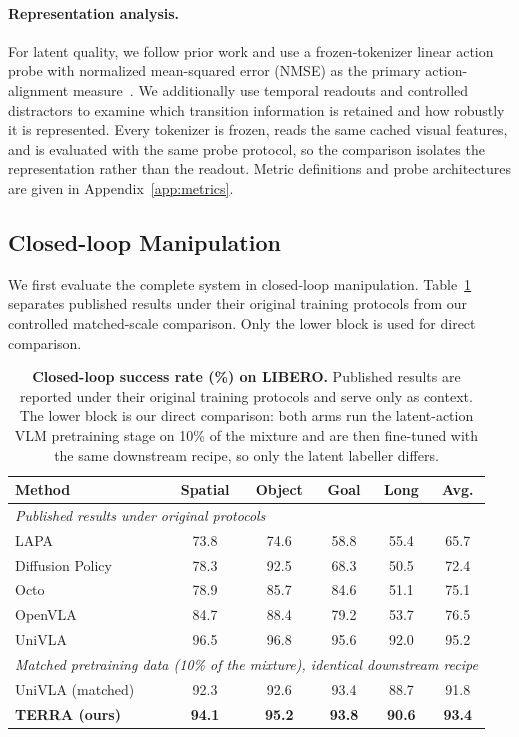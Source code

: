 \paragraph{Representation analysis.}
For latent quality, we follow prior work and use a frozen-tokenizer linear
action probe with normalized mean-squared error (NMSE) as the primary
action-alignment measure~\citep{lee2026why}.
We additionally use temporal readouts and controlled distractors to examine
which transition information is retained and how robustly it is represented.
Every tokenizer is frozen, reads the same cached visual features, and is
evaluated with the same probe protocol, so the comparison isolates the
representation rather than the readout.
Metric definitions and probe architectures are given in
Appendix~\ref{app:metrics}.


\subsection{Closed-loop Manipulation}
\label{sec:closed_loop}

We first evaluate the complete system in closed-loop manipulation.
Table~\ref{tab:closed_loop_main} separates published results under their
original training protocols from our controlled matched-scale comparison.
Only the lower block is used for direct comparison.

\begin{table}[t]
\caption{
\textbf{Closed-loop success rate (\%) on LIBERO.}
Published results are reported under their original training protocols and
serve only as context.
The lower block is our direct comparison: both arms run the latent-action
VLM pretraining stage on 10\% of the mixture and are then fine-tuned with the
same downstream recipe, so only the latent labeller differs.
}
\label{tab:closed_loop_main}
\centering
\footnotesize
\setlength{\tabcolsep}{3.6pt}
\begin{tabular}{lccccc}
\toprule
Method & Spatial & Object & Goal & Long & Avg. \\
\midrule
\multicolumn{6}{l}{\textit{Published results under original protocols}} \\
LAPA             & 73.8 & 74.6 & 58.8 & 55.4 & 65.7 \\
Diffusion Policy & 78.3 & 92.5 & 68.3 & 50.5 & 72.4 \\
Octo             & 78.9 & 85.7 & 84.6 & 51.1 & 75.1 \\
OpenVLA          & 84.7 & 88.4 & 79.2 & 53.7 & 76.5 \\
UniVLA           & 96.5 & 96.8 & 95.6 & 92.0 & 95.2 \\
\midrule
\multicolumn{6}{l}{\textit{Matched pretraining data (10\% of the mixture), identical downstream recipe}} \\
UniVLA (matched)
& 92.3 & 92.6 & 93.4 & 88.7 & 91.8 \\
\textbf{TERRA (ours)}
& \textbf{94.1} & \textbf{95.2} & \textbf{93.8} & \textbf{90.6}
& \textbf{93.4} \\
\bottomrule
\end{tabular}
\end{table}


